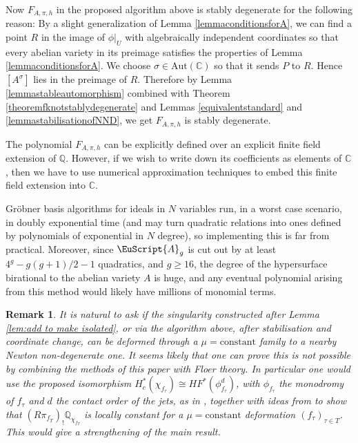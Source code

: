 \documentclass[11pt]{amsart}
\newtheorem{remark}[thm]{Remark}
\newcommand{\scrA}{\EuScript{A}}
\newcommand{\bQ}{\mathbb{Q}}
\newcommand{\bC}{\mathbb{C}}
\newcommand{\Aut}{\mathrm{Aut}}
\numberwithin{equation}{section}
\renewcommand{\geq}{\geqslant}
\begin{document}
Now $F_{A,\pi,h}$ in the proposed algorithm above is stably degenerate for the following reason:
By a slight generalization of Lemma \ref{lemmaconditionsforA}, we can find a point $R$ in the image of $\phi|_U$ with algebraically independent coordinates so that every abelian variety in its preimage satisfies the properties of Lemma \ref{lemmaconditionsforA}.
We choose $\sigma \in \Aut(\bC)$ so that it sends $P$ to $R$.
Hence $[A^\sigma]$ lies in the preimage of $R$.
Therefore by Lemma \ref{lemmastableautomorphism} combined with Theorem \ref{theoremfknotstablydegenerate} and Lemmas \ref{equivalentstandard} and \ref{lemmastabilisationofNND}, we get $F_{A,\pi,h}$ is stably degenerate.

The polynomial $F_{A,\pi,h}$ can be explicitly defined over an explicit finite field extension of $\bQ$. However, if we wish to write down its coefficients as elements of $\bC$, then we have to use numerical approximation techniques to embed this finite field extension into $\bC$.


Gr\"obner basis algorithms for ideals in $N$ variables run, in a worst case scenario, in doubly exponential time (and may turn quadratic relations into ones defined by polynomials of exponential in $N$ degree), so implementing this is far from practical. Moreover, since $\scrA_g$ is cut out by at least $4^g-g(g+1)/2-1$ quadratics, and $g \geq 16$, the degree of the hypersurface birational to the abelian variety $A$ is huge, and any eventual polynomial arising from this method would likely have millions of monomial terms.

\begin{remark}
	It is natural to ask if the singularity constructed after Lemma \ref{lem:add to make isolated},
	or via the algorithm above, after stabilisation and coordinate change, can be deformed through a $\mu = \text{constant}$ family to a nearby Newton non-degenerate one.
	It seems likely that one can prove this is not possible by combining the methods of this paper with
	Floer theory. In particular one would use the proposed isomorphism $H^*_c(\chi_{f_\tau}) \cong HF^*(\phi_{f_\tau}^d)$, with $\phi_{f_\tau}$ the monodromy of $f_\tau$ and $d$ the contact order of the jets, as in  \cite[Theorem 7.2.69]{McLean:arcsurvey},
	together with ideas from \cite{fernandez2024symplectic}
	to show that $(R\pi_{f_T})_!\bQ_{\chi_{f_T}}$ is locally constant for a $\mu = \text{constant}$ deformation $(f_\tau)_{\tau \in T}$. This would give a strengthening of the main result.
\end{remark}










\end{document}
